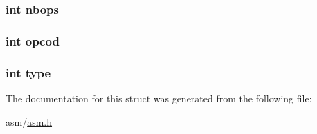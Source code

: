 \subsubsection[{\texorpdfstring{nbops}{nbops}}]{\setlength{\rightskip}{0pt plus 5cm}int nbops}\hypertarget{structinstruction_name_a34aaf7e4790814fce09b357e1de1a4da}{}\label{structinstruction_name_a34aaf7e4790814fce09b357e1de1a4da}
\subsubsection[{\texorpdfstring{opcod}{opcod}}]{\setlength{\rightskip}{0pt plus 5cm}int opcod}\hypertarget{structinstruction_name_a87e59bd69d9de26089c9d13e5c75c086}{}\label{structinstruction_name_a87e59bd69d9de26089c9d13e5c75c086}
\subsubsection[{\texorpdfstring{type}{type}}]{\setlength{\rightskip}{0pt plus 5cm}int type}\hypertarget{structinstruction_name_ac765329451135abec74c45e1897abf26}{}\label{structinstruction_name_ac765329451135abec74c45e1897abf26}


The documentation for this struct was generated from the following file\+:\begin{DoxyCompactItemize}
\item 
asm/\hyperlink{asm_8h}{asm.\+h}\end{DoxyCompactItemize}
